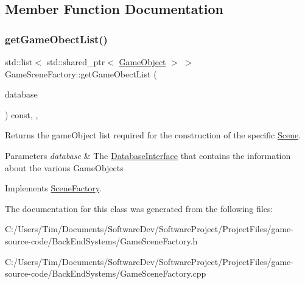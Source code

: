 \subsection{Member Function Documentation}
\mbox{\label{class_game_scene_factory_a2db801c1a1703a14a00c7b6e8bdca5b0}} 
\subsubsection{\texorpdfstring{get\+Game\+Obect\+List()}{getGameObectList()}}
{\footnotesize\ttfamily std\+::list$<$ std\+::shared\+\_\+ptr$<$ \hyperlink{class_game_object}{Game\+Object} $>$ $>$ Game\+Scene\+Factory\+::get\+Game\+Obect\+List (\begin{DoxyParamCaption}\item[{std\+::shared\+\_\+ptr$<$ \hyperlink{class_database_interface}{Database\+Interface} $>$}]{database }\end{DoxyParamCaption}) const\hspace{0.3cm}{\ttfamily [override]}, {\ttfamily [protected]}, {\ttfamily [virtual]}}



Returns the game\+Object list required for the construction of the specific \hyperlink{class_scene}{Scene}. 


\begin{DoxyParams}{Parameters}
{\em database} & The \hyperlink{class_database_interface}{Database\+Interface} that contains the information about the various Game\+Objects \\
\hline
\end{DoxyParams}


Implements \hyperlink{class_scene_factory_a2c8541230e95df49d2ab39b7c6ecdb78}{Scene\+Factory}.



The documentation for this class was generated from the following files\+:\begin{DoxyCompactItemize}
\item 
C\+:/\+Users/\+Tim/\+Documents/\+Software\+Dev/\+Software\+Project/\+Project\+Files/game-\/source-\/code/\+Back\+End\+Systems/Game\+Scene\+Factory.\+h\item 
C\+:/\+Users/\+Tim/\+Documents/\+Software\+Dev/\+Software\+Project/\+Project\+Files/game-\/source-\/code/\+Back\+End\+Systems/Game\+Scene\+Factory.\+cpp\end{DoxyCompactItemize}

